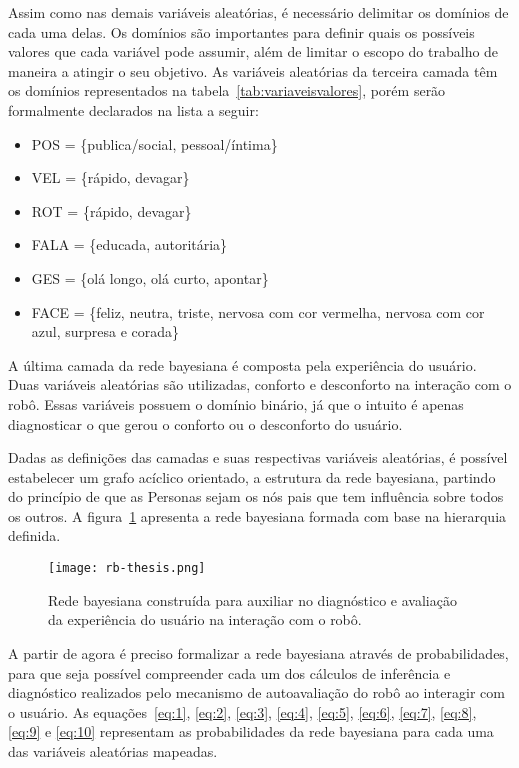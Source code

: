 Assim como nas demais variáveis aleatórias, é necessário delimitar os domínios de cada uma delas. Os domínios são importantes para definir quais os possíveis valores que cada variável pode assumir, além de limitar o escopo do trabalho de maneira a atingir o seu objetivo. As variáveis aleatórias da terceira camada têm os domínios representados na tabela~\ref{tab:variaveisvalores}, porém serão formalmente declarados na lista a seguir:

\begin{itemize}
	\item POS = \{publica/social, pessoal/íntima\}
	\item VEL = \{rápido, devagar\}
	\item ROT = \{rápido, devagar\}
	\item FALA = \{educada, autoritária\}
	\item GES = \{olá longo, olá curto, apontar\}
	\item FACE = \{feliz, neutra, triste, nervosa com cor vermelha, nervosa com cor azul, surpresa e corada\}
\end{itemize}

A última camada da rede bayesiana é composta pela experiência do usuário. Duas variáveis aleatórias são utilizadas, conforto e desconforto na interação com o robô. Essas variáveis possuem o domínio binário, já que o intuito é apenas diagnosticar o que gerou o conforto ou o desconforto do usuário.

Dadas as definições das camadas e suas respectivas variáveis aleatórias, é possível estabelecer um grafo acíclico orientado, a estrutura da rede bayesiana, partindo do princípio de que as Personas sejam os nós pais que tem influência sobre todos os outros. A figura~\ref{fig:rb} apresenta a rede bayesiana formada com base na hierarquia definida.

\begin{figure}[ht!]
	\centering
	\begin{minipage}{\textwidth}
		\caption{Rede bayesiana construída para auxiliar no diagnóstico e avaliação da experiência do usuário na interação com o robô.}
		\texttt{[image: rb-thesis.png]}
		\label{fig:rb}
	\end{minipage}
\end{figure}

A partir de agora é preciso formalizar a rede bayesiana através de probabilidades, para que seja possível compreender cada um dos cálculos de inferência e diagnóstico realizados pelo mecanismo de autoavaliação do robô ao interagir com o usuário. As equações~\ref{eq:1}, \ref{eq:2}, \ref{eq:3}, \ref{eq:4}, \ref{eq:5}, \ref{eq:6}, \ref{eq:7}, \ref{eq:8}, \ref{eq:9} e \ref{eq:10} representam as probabilidades da rede bayesiana para cada uma das variáveis aleatórias mapeadas.

